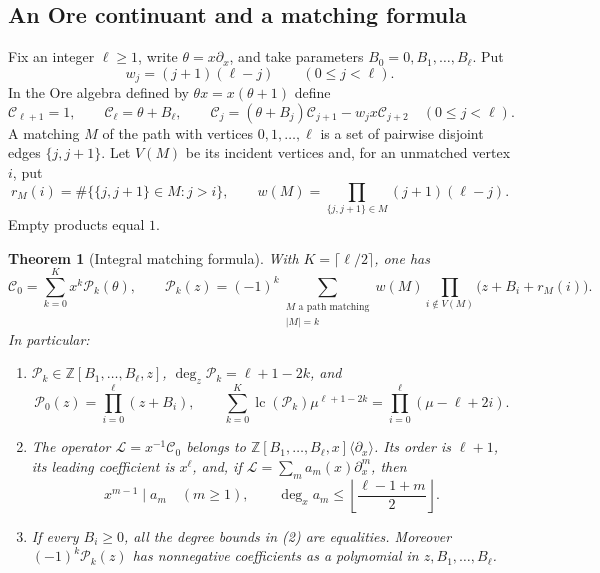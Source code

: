 \documentclass[11pt,a4paper]{article}
\newtheorem{theorem}{Theorem}[section]
\theoremstyle{definition}
\theoremstyle{remark}
\numberwithin{equation}{section}
\begin{document}
\subsection{An Ore continuant and a matching formula}

Fix an integer $\ell\ge1$, write $\theta=x\partial_x$, and take parameters
$B_0=0,B_1,\ldots,B_\ell$.  Put
\[
 w_j=(j+1)(\ell-j)\qquad(0\le j<\ell).
\]
In the Ore algebra defined by $\theta x=x(\theta+1)$ define
\begin{equation}\label{B:eq:ic-recursion}
 \mathcal C_{\ell+1}=1,\qquad \mathcal C_\ell=\theta+B_\ell,
 \qquad
 \mathcal C_j=(\theta+B_j)\mathcal C_{j+1}
                 -w_jx\mathcal C_{j+2}\quad(0\le j<\ell).
\end{equation}
A matching $M$ of the path with vertices $0,1,\ldots,\ell$ is a set of
pairwise disjoint edges $\{j,j+1\}$.  Let $V(M)$ be its incident vertices and,
for an unmatched vertex $i$, put
\[
 r_M(i)=\#\{\{j,j+1\}\in M:j>i\},\qquad
 w(M)=\prod_{\{j,j+1\}\in M}(j+1)(\ell-j).
\]
Empty products equal $1$.

\begin{theorem}[Integral matching formula]\label{B:thm:ic-matching}
With $K=\lceil\ell/2\rceil$, one has
\begin{equation}\label{B:eq:ic-matching}
 \mathcal C_0=\sum_{k=0}^{K}x^k\mathcal P_k(\theta),\qquad
 \mathcal P_k(z)=(-1)^k
 \sum_{\substack{M\text{ a path matching}\\|M|=k}}
 w(M)\prod_{i\notin V(M)}\bigl(z+B_i+r_M(i)\bigr).
\end{equation}
In particular:
\begin{enumerate}
\item $\mathcal P_k\in\mathbb Z[B_1,\ldots,B_\ell,z]$,
$\deg_z\mathcal P_k=\ell+1-2k$, and
\[
 \mathcal P_0(z)=\prod_{i=0}^{\ell}(z+B_i),\qquad
 \sum_{k=0}^K\operatorname{lc}(\mathcal P_k)\mu^{\ell+1-2k}
       =\prod_{i=0}^{\ell}(\mu-\ell+2i).
\]
\item The operator $\mathcal L=x^{-1}\mathcal C_0$ belongs to
$\mathbb Z[B_1,\ldots,B_\ell,x]\langle\partial_x\rangle$.
Its order is $\ell+1$, its leading coefficient is $x^\ell$, and, if
$\mathcal L=\sum_m a_m(x)\partial_x^m$, then
\[
 x^{m-1}\mid a_m\quad(m\ge1),\qquad
 \deg_x a_m\le\left\lfloor\frac{\ell-1+m}{2}\right\rfloor.
\]
\item If every $B_i\ge0$, all the degree bounds in (2) are equalities.
Moreover $(-1)^k\mathcal P_k(z)$ has nonnegative coefficients as a polynomial
in $z,B_1,\ldots,B_\ell$.
\end{enumerate}
\end{theorem}
\end{document}
